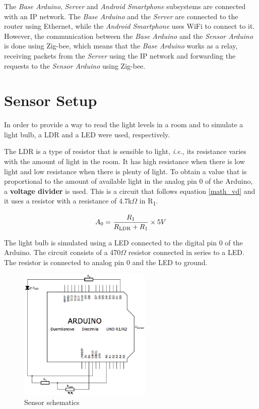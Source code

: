 \documentclass[conference, a4paper]{IEEEtran}
\begin{document}
The \textit{Base Arduino}, \textit{Server} and \textit{Android Smartphone} subsystems are connected with an IP network. The \textit{Base Arduino} and the \textit{Server} are connected to the router using Ethernet, while the \textit{Android Smartphone} uses WiFi to connect to it. However, the communication between the \textit{Base Arduino} and the \textit{Sensor Arduino} is done using Zig-bee, which means that the \textit{Base Arduino} works as a relay, receiving packets from the \textit{Server} using the IP network and forwarding the requests to the \textit{Sensor Arduino} using Zig-bee.

\section{Sensor Setup}

In order to provide a way to read the light levels in a room and to simulate a light bulb, a LDR and a LED were used, respectively.

The LDR is a type of resistor that is sensible to light, \textit{i.e.}, its resistance varies with the amount of light in the room. It has high resistance when there is low light and low resistance when there is plenty of light. To obtain a value that is proportional to the amount of available light in the analog pin 0 of the Arduino, a \textbf{voltage divider} is used. This is a circuit that follows equation \ref{math_vd} and it uses a resistor with a resistance of 4.7k$\Omega$ in R\textsubscript{1}.

\begin{equation}
A\textsubscript{0} = \frac{R\textsubscript{1}}{R\textsubscript{LDR}+R\textsubscript{1}}\times5V
\label{math_vd}
\end{equation}

The light bulb is simulated using a LED connected to the digital pin 0 of the Arduino. The circuit consists of a 470$\Omega$ resistor connected in series to a LED. The resistor is connected to analog pin 0 and the LED to ground.

\begin{figure}[H]
\centering
\includegraphics[width=2.5in]{Schematics}
\caption{Sensor schematics}
\label{fig_schem}
\end{figure}
\end{document}
